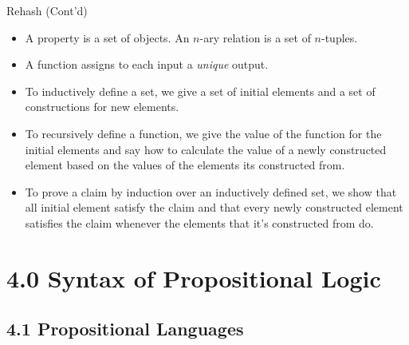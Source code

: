 \documentclass[../slides.tex]{subfiles}
\begin{document}
\begin{frame}{Rehash (Cont'd)}
	
\begin{itemize}
			
		\item A property is a set of objects. An $n$-ary relation is a set of $n$-tuples.
		
		\item A function assigns to each input a \emph{unique} output.
		
		\item \alert{To inductively define a set, we give a set of initial elements and a set of constructions for new elements.}
		
		\item \alert{To recursively define a function, we give the value of the function for the initial elements and say how to calculate the value of a newly constructed element based on the values of the elements its constructed from.}
		
		\item \alert{To prove a claim by induction over an inductively defined set, we show that all initial element satisfy the claim and that every newly constructed element satisfies the claim whenever the elements that it's constructed from do.}
			

	\end{itemize}

\end{frame}

\section{4.0 Syntax of Propositional Logic}
\subsection{4.1 Propositional Languages}
\end{document}
